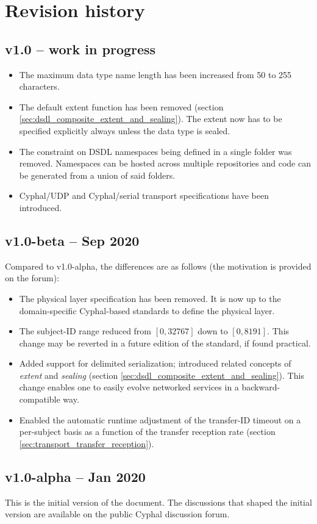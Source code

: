\section{Revision history}

\subsection{v1.0 -- work in progress}

\begin{itemize}
    \item The maximum data type name length has been increased from 50 to 255 characters.

    \item The default extent function has been removed (section \ref{sec:dsdl_composite_extent_and_sealing}).
    The extent now has to be specified explicitly always unless the data type is sealed.

    \item The constraint on DSDL namespaces being defined in a single folder was removed. Namespaces can be hosted
    across multiple repositories and code can be generated from a union of said folders.

    \item Cyphal/UDP and Cyphal/serial transport specifications have been introduced.
\end{itemize}

\subsection{v1.0-beta -- Sep 2020}

Compared to v1.0-alpha, the differences are as follows (the motivation is provided on the forum):

\begin{itemize}
    \item The physical layer specification has been removed.
    It is now up to the domain-specific Cyphal-based standards to define the physical layer.

    \item The subject-ID range reduced from $[0, 32767]$ down to $[0, 8191]$.
    This change may be reverted in a future edition of the standard, if found practical.

    \item Added support for delimited serialization; introduced related concepts of \emph{extent} and \emph{sealing}
    (section \ref{sec:dsdl_composite_extent_and_sealing}).
    This change enables one to easily evolve networked services in a backward-compatible way.

    \item Enabled the automatic runtime adjustment of the transfer-ID timeout on a per-subject basis
    as a function of the transfer reception rate (section \ref{sec:transport_transfer_reception}).
\end{itemize}

\subsection{v1.0-alpha -- Jan 2020}

This is the initial version of the document.
The discussions that shaped the initial version are available on the public Cyphal discussion forum.
